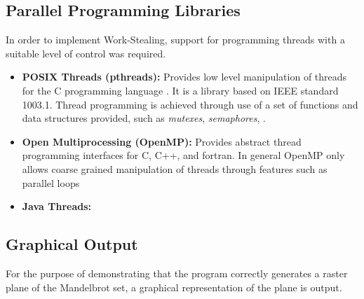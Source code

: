 \subsection*{Parallel Programming Libraries}
In order to implement Work-Stealing, support for programming threads 
with a suitable level of control was required.

\begin{itemize}
\item \textbf{POSIX Threads (pthreads):} Provides low level manipulation of threads for the C programming language \cite{pthreadover}. 
              It is a library based on IEEE standard 1003.1. Thread programming is achieved through use of a set of functions and data
              structures provided, such as \textit{mutexes}, \textit{semaphores}, \textit{ }. %
             
\item \textbf{Open Multiprocessing (OpenMP):} Provides abstract thread programming interfaces for C, C++, and fortran.
              In general OpenMP only allows coarse grained manipulation of threads through features such as parallel loops %
              \cite{ompvspthr}

\item \textbf{Java Threads:} %
\end{itemize}

\subsection*{Graphical Output}
For the purpose of demonstrating that the program correctly generates a raster plane
of the Mandelbrot set, a graphical representation of the plane is output.

